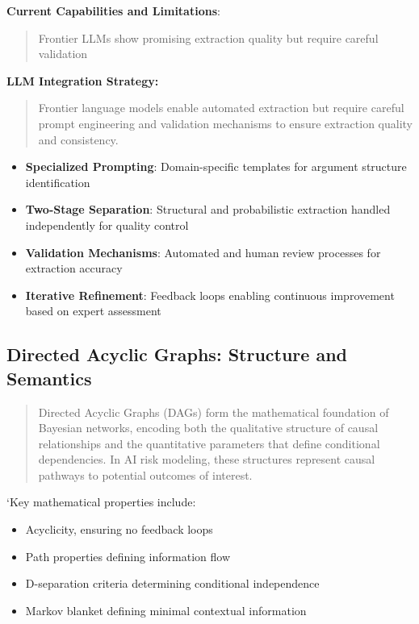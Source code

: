 \documentclass[
  11pt,
  letterpaper,
]{book}
\providecommand{\tightlist}{%
  \setlength{\itemsep}{0pt}\setlength{\parskip}{0pt}}
\begin{document}
\textbf{Current Capabilities and Limitations}:

\begin{quote}
Frontier LLMs show promising extraction quality but require careful
validation
\end{quote}

\textbf{LLM Integration Strategy:}

\begin{quote}
Frontier language models enable automated extraction but require careful
prompt engineering and validation mechanisms to ensure extraction
quality and consistency.
\end{quote}

\begin{itemize}
\tightlist
\item
  \textbf{Specialized Prompting}: Domain-specific templates for argument
  structure identification
\item
  \textbf{Two-Stage Separation}: Structural and probabilistic extraction
  handled independently for quality control
\item
  \textbf{Validation Mechanisms}: Automated and human review processes
  for extraction accuracy
\item
  \textbf{Iterative Refinement}: Feedback loops enabling continuous
  improvement based on expert assessment
\end{itemize}

\subsection{Directed Acyclic Graphs: Structure and
Semantics}\label{sec-dag-structure}

\begin{quote}
Directed Acyclic Graphs (DAGs) form the mathematical foundation of
Bayesian networks, encoding both the qualitative structure of causal
relationships and the quantitative parameters that define conditional
dependencies. In AI risk modeling, these structures represent causal
pathways to potential outcomes of interest.
\end{quote}

`Key mathematical properties include:

\begin{itemize}
\tightlist
\item
  Acyclicity, ensuring no feedback loops
\item
  Path properties defining information flow
\item
  D-separation criteria determining conditional independence
\item
  Markov blanket defining minimal contextual information
\end{itemize}
\end{document}
